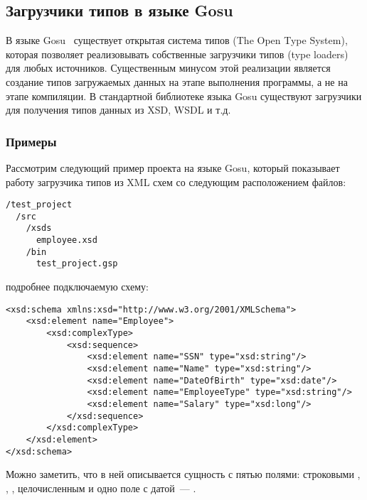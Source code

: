\subsection{Загрузчики типов в языке Gosu}\label{gosu-type-loaders}
В языке Gosu~\cite{gosuguide} существует открытая система типов (The Open Type System), которая позволяет реализовывать собственные загрузчики типов (type loaders) для любых источников.
Существенным минусом этой реализации является создание типов загружаемых данных на этапе выполнения программы, а не на этапе компиляции.
В стандартной библиотеке языка Gosu существуют загрузчики для получения типов данных из XSD, WSDL и т.д.

\subsubsection{Примеры}

Рассмотрим следующий пример проекта на языке Gosu, который показывает работу загрузчика типов из XML схем
со следующим расположением файлов:

\begin{lstlisting}[caption={Расположение файлов в примере загрузчиков типов на языке Gosu. \td}, label=gosu-project-layout]
/test_project 
  /src 
    /xsds
      employee.xsd 
    /bin 
      test_project.gsp
\end{lstlisting}

 подробнее подключаемую схему:

\begin{lstlisting}[caption={Содержимое файла \texttt{employee.xsd} из примера~\ref{gosu-project-layout}.}, label=gosu-employee-xsd]
<xsd:schema xmlns:xsd="http://www.w3.org/2001/XMLSchema">
    <xsd:element name="Employee">
        <xsd:complexType>
            <xsd:sequence>
                <xsd:element name="SSN" type="xsd:string"/>
                <xsd:element name="Name" type="xsd:string"/>
                <xsd:element name="DateOfBirth" type="xsd:date"/>
                <xsd:element name="EmployeeType" type="xsd:string"/>
                <xsd:element name="Salary" type="xsd:long"/>
            </xsd:sequence>
        </xsd:complexType>
    </xsd:element>
</xsd:schema>
\end{lstlisting}

Можно заметить, что в ней описывается сущность  с пятью полями: строковыми 
, , , целочисленным 
и одно поле с датой~--- .

